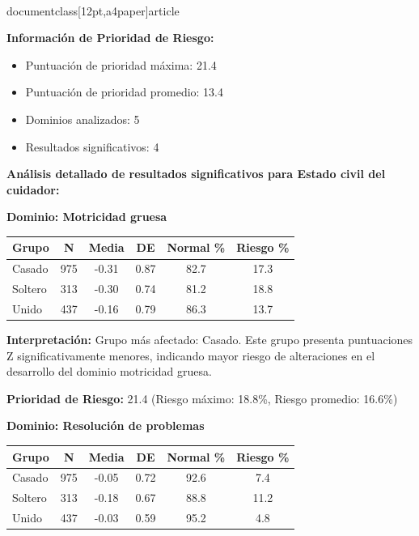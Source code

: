 \\documentclass[12pt,a4paper]{article}
\begin{document}
\textbf{Información de Prioridad de Riesgo:}
\begin{itemize}
\item Puntuación de prioridad máxima: 21.4
\item Puntuación de prioridad promedio: 13.4
\item Dominios analizados: 5
\item Resultados significativos: 4
\end{itemize}


\textbf{Análisis detallado de resultados significativos para Estado civil del cuidador:}


\textbf{Dominio: Motricidad gruesa}


\begin{center}
\begin{tabular}{|l|c|c|c|c|c|}
\hline
\textbf{Grupo} & \textbf{N} & \textbf{Media} & \textbf{DE} & \textbf{Normal \%} & \textbf{Riesgo \%} \\
\hline
Casado & 975 & -0.31 & 0.87 & 82.7 & 17.3 \\
Soltero & 313 & -0.30 & 0.74 & 81.2 & 18.8 \\
Unido & 437 & -0.16 & 0.79 & 86.3 & 13.7 \\

\hline
\end{tabular}
\end{center}


\textbf{Interpretación:} Grupo más afectado: Casado. Este grupo presenta puntuaciones Z significativamente menores, indicando mayor riesgo de alteraciones en el desarrollo del dominio motricidad gruesa.

\textbf{Prioridad de Riesgo:} 21.4 (Riesgo máximo: 18.8\%, Riesgo promedio: 16.6\%)


\vspace{0.5cm}


\textbf{Dominio: Resolución de problemas}


\begin{center}
\begin{tabular}{|l|c|c|c|c|c|}
\hline
\textbf{Grupo} & \textbf{N} & \textbf{Media} & \textbf{DE} & \textbf{Normal \%} & \textbf{Riesgo \%} \\
\hline
Casado & 975 & -0.05 & 0.72 & 92.6 & 7.4 \\
Soltero & 313 & -0.18 & 0.67 & 88.8 & 11.2 \\
Unido & 437 & -0.03 & 0.59 & 95.2 & 4.8 \\

\hline
\end{tabular}
\end{center}
\end{document}
